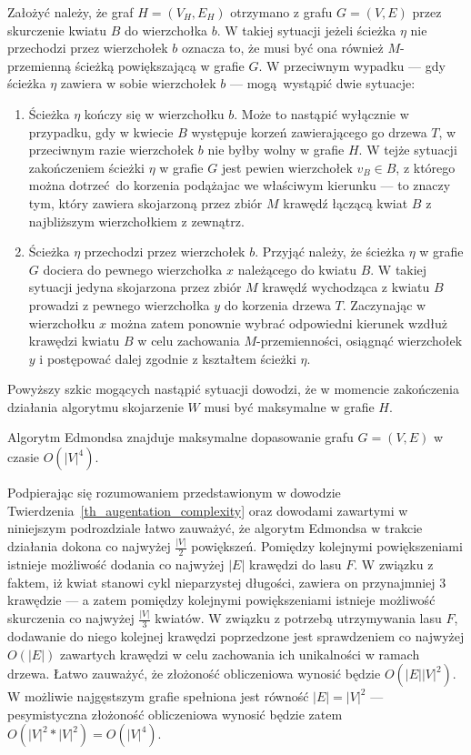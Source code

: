 {\begin{bproof}
    Założyć należy, że graf $H=(V_H, E_H)$ otrzymano z grafu $G=(V, E)$ przez skurczenie kwiatu $B$ do wierzchołka $b$.
    W takiej sytuacji jeżeli ścieżka $\eta$ nie przechodzi przez wierzchołek $b$ oznacza to, że musi być ona również $M$-przemienną ścieżką powiększającą w grafie $G$. W przeciwnym wypadku --- gdy ścieżka $\eta$ zawiera w sobie wierzchołek $b$ --- mogą wystąpić dwie sytuacje:
    \begin{enumerate}
      \item Ścieżka $\eta$ kończy się w wierzchołku $b$.
      Może to nastąpić wyłącznie w przypadku, gdy w kwiecie $B$ występuje korzeń zawierającego go drzewa $T$, w przeciwnym razie wierzchołek $b$ nie byłby wolny w grafie $H$.
      W tejże sytuacji zakończeniem ścieżki $\eta$ w grafie $G$ jest pewien wierzchołek $v_B \in B$, z którego można dotrzeć do korzenia podążajac we właściwym kierunku --- to znaczy tym, który zawiera skojarzoną przez zbiór $M$ krawędź łączącą kwiat $B$ z najbliższym wierzchołkiem z zewnątrz.
      \item Ścieżka $\eta$ przechodzi przez wierzchołek $b$.
      Przyjąć należy, że ścieżka $\eta$ w grafie $G$ dociera do pewnego wierzchołka $x$ należącego do kwiatu $B$.
      W takiej sytuacji jedyna skojarzona przez zbiór $M$ krawędź wychodząca z kwiatu $B$ prowadzi z pewnego wierzchołka $y$ do korzenia drzewa $T$.
      Zaczynając w wierzchołku $x$ można zatem ponownie wybrać odpowiedni kierunek wzdłuż krawędzi kwiatu $B$ w celu zachowania $M$-przemienności, osiągnąć wierzchołek $y$ i postępować dalej zgodnie z kształtem ścieżki $\eta$.
    \end{enumerate}

    Powyższy szkic mogących nastąpić sytuacji dowodzi, że w momencie zakończenia działania algorytmu skojarzenie $W$ musi być maksymalne w grafie $H$.
  \end{bproof}
  \begin{theorem}
    Algorytm Edmondsa znajduje maksymalne dopasowanie grafu $G=(V, E)$ w czasie $O(|V|^4)$.
  \end{theorem}
  \begin{bproof}
    Podpierając się rozumowaniem przedstawionym w dowodzie Twierdzenia~\ref{th_augentation_complexity} oraz dowodami zawartymi w niniejszym podrozdziale łatwo zauważyć, że algorytm Edmondsa w trakcie działania dokona co najwyżej $\frac{|V|}{2}$ powiększeń.
    Pomiędzy kolejnymi powiększeniami istnieje możliwość dodania co najwyżej $|E|$ krawędzi do lasu $F$.
    W związku z faktem, iż kwiat stanowi cykl nieparzystej długości, zawiera on przynajmniej 3 krawędzie --- a zatem pomiędzy kolejnymi powiększeniami istnieje możliwość skurczenia co najwyżej $\frac{|V|}{3}$ kwiatów.
    W związku z potrzebą utrzymywania lasu $F$, dodawanie do niego kolejnej krawędzi poprzedzone jest sprawdzeniem co najwyżej $O(|E|)$ zawartych krawędzi w celu zachowania ich unikalności w ramach drzewa.
    Łatwo zauważyć, że złożoność obliczeniowa wynosić będzie $O(|E||V|^2)$.
    W możliwie najgęstszym grafie spełniona jest równość $|E|=|V|^2$ --- pesymistyczna złożoność obliczeniowa wynosić będzie zatem $O(|V|^2*|V|^2)=O(|V|^4)$.
  \end{bproof}
}